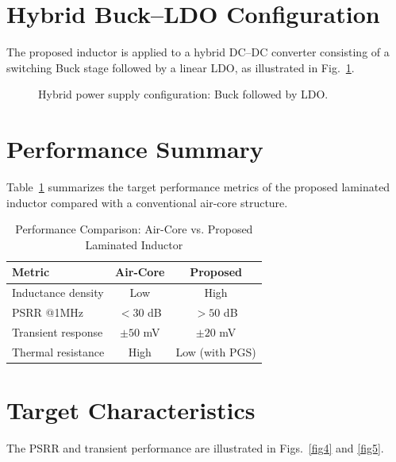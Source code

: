 \documentclass[journal]{IEEEtran}
\begin{document}
\section{Hybrid Buck--LDO Configuration}
The proposed inductor is applied to a hybrid DC--DC converter consisting of a switching Buck stage followed by a linear LDO, as illustrated in Fig.~\ref{fig2}.

\begin{figure}[!t]
\centering
{}
\caption{Hybrid power supply configuration: Buck followed by LDO.}
\label{fig2}
\end{figure}

\section{Performance Summary}
Table~\ref{tab1} summarizes the target performance metrics of the proposed laminated inductor compared with a conventional air-core structure.

\begin{table}[!t]
\centering
\caption{Performance Comparison: Air-Core vs. Proposed Laminated Inductor}
\label{tab1}
\begin{tabular}{@{}lcc@{}}
\toprule
Metric & Air-Core & Proposed \\
\midrule
Inductance density & Low & High \\
PSRR @1MHz & $<30$ dB & $>50$ dB \\
Transient response & $\pm 50$ mV & $\pm 20$ mV \\
Thermal resistance & High & Low (with PGS) \\
\bottomrule
\end{tabular}
\end{table}

\section{Target Characteristics}
The PSRR and transient performance are illustrated in Figs.~\ref{fig4} and \ref{fig5}.
\end{document}
